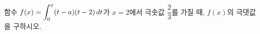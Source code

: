 함수 $f(x)=\displaystyle\int_{0}^{x} (t-a)(t-2)\mkern3mu dt$가 $x=2$에서 극솟값 $\dfrac{2}{3}$를 가질 때, $f(x)$의 극댓값을 구하시오. 

